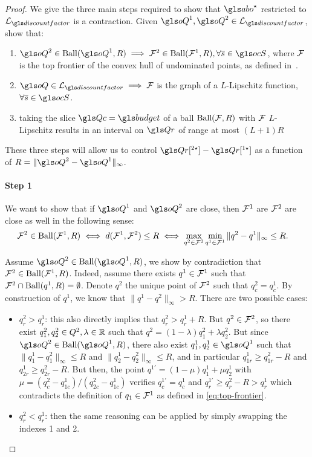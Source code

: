 \begin{subappendices}
\begin{proof}
    We give the three main steps required to show that $\abo^{\star}$ restricted to $\cL_{\discountfactor}$ is a contraction. Given $\oQ^1, \oQ^2\in\cL_{\discountfactor}$, show that:

    \begin{enumerate}
        \item $\oQ^2\in\text{Ball}(\oQ^1,R)\implies\cF^2\in\text{Ball}(\cF^1, R), \forall\os\in\ocS$, where $\mathcal{F}$ is the top frontier of the convex hull of undominated points, as defined in~.
        \item $\oQ\in\cL_{\discountfactor} \implies \cF$ is the graph of a $L$-Lipschitz function, $\forall\os\in\ocS$.
        \item taking the slice $\Qc=\budget$ of a ball $\text{Ball}(\mathcal{F},R)$ with $\mathcal{F}$ $L$-Lipschitz results in an interval on $\Qr$ of range at most $(L+1)R$
    \end{enumerate}
	
	These three steps will allow us to control $\Qr[^{2\star}] - \Qr[^{1\star}]$ as a function of $R = \|\oQ^2-\oQ^1\|_\infty$.

    \paragraph{Step 1}

    We want to show that if $\oQ^1$ and $\oQ^2$ are close, then $\mathcal{F}^1$ are $\mathcal{F}^2$ are close as well in the following sense:
    \begin{align}
        \mathcal{F}^2\in\text{Ball}(\mathcal{F}^1, R) &\iff d(\mathcal{F}^1, \mathcal{F}^2) \leq R \iff \max_{q^2\in\mathcal{F}^2}\min_{q^1\in\mathcal{F}^1}\|q^2-q^1\|_\infty \leq R.
        \label{eq:ball-set}
    \end{align}

    Assume $\oQ^2\in\text{Ball}(\oQ^1,R)$, we show by contradiction that $\mathcal{F}^2 \in \text{Ball}(\mathcal{F}^1, R)$. Indeed, assume there exists $q^1\in \mathcal{F}^1$ such that $\mathcal{F}^2 \cap \text{Ball}(q^1, R) = \emptyset$. Denote $q^2$ the unique point of $\mathcal{F}^2$ such that $q^2_c = q^1_c$. By construction of $q^1$, we know that $\|q^1-q^2\|_\infty > R$. There are two possible cases:
    \begin{itemize}
        \item $q^2_r > q^1_r$: this also directly implies that $q^2_r > q^1_r + R$. But $q^2\in\mathcal{F}^2$, so there exist $q^2_1, q^2_2\in Q^{2},\lambda\in\mathbb{R}$ such that $q^2 = (1-\lambda)q^2_1 + \lambda q^2_2$. But since $\oQ^2\in \text{Ball}(\oQ^1, R)$, there also exist $q_1^1, q^1_2\in \oQ^1$ such that $\|q^1_1-q^2_1\|_\infty \leq R$ and $\|q^1_2-q^2_2\|_\infty \leq R$, and in particular $q^1_{1r}\geq q^2_{1r}-R$ and $q^1_{2r}\geq q^2_{2r}-R$. But then, the point $q^{1'}=(1-\mu)q^1_1 + \mu q^1_2$ with $\mu=(q^2_c-q^1_{1c})/(q^2_{2c}-q^1_{1c})$ verifies $q^{1'}_c = q^1_c$ and $q^{1'}_r \geq q^2_r - R > q^1_r$ which contradicts the definition of $q_1\in\mathcal{F}^1$ as defined in \eqref{eq:top-frontier}.
        \item $q^2_r < q^1_r$: then the same reasoning can be applied by simply swapping the indexes 1 and 2.
    \end{itemize}


\end{proof}
\end{subappendices}
